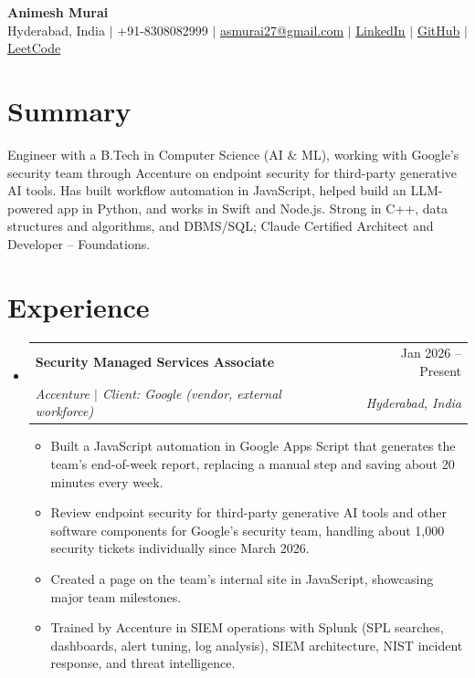 \documentclass[a4paper,11pt]{article}
\makeatletter
\newcommand{\resumeItem}[1]{\item\small{#1\vspace{-1pt}}}
\newcommand{\resumeSubheading}[4]{
  \vspace{-1pt}\item
    \begin{tabularx}{0.97\textwidth}[t]{@{}>{\raggedright\arraybackslash}X@{\hspace{0.75em}}r@{}}
      \textbf{#1} & #2 \\
      \textit{\small#3} & \textit{\small #4} \\
    \end{tabularx}\vspace{-3pt}
}
\newcommand{\resumeSubItemListStart}{\begin{itemize}[leftmargin=0.15in, label={}]}
\newcommand{\resumeSubItemListEnd}{\end{itemize}}
\newcommand{\resumeItemListStart}{\begin{itemize}[itemsep=2pt]}
\newcommand{\resumeItemListEnd}{\end{itemize}\vspace{-2pt}}
\makeatother
\begin{document}
\begin{center}
    {\Huge\bfseries Animesh Murai} \\ \vspace{4pt}
    \small Hyderabad, India $|$ +91-8308082999 $|$
    \href{mailto:asmurai27@gmail.com}{\underline{asmurai27@gmail.com}} $|$
    \href{https://www.linkedin.com/in/animesh-murai-538384253/}{\underline{LinkedIn}} $|$
    \href{https://github.com/muraias7781}{\underline{GitHub}} $|$
    \href{https://leetcode.com/u/sAMurai7781/}{\underline{LeetCode}}
\end{center}

\section{Summary}
  \small{Engineer with a B.Tech in Computer Science (AI \& ML), working with Google's security team through Accenture on endpoint security for third-party generative AI tools. Has built workflow automation in JavaScript, helped build an LLM-powered app in Python, and works in Swift and Node.js. Strong in C++, data structures and algorithms, and DBMS/SQL; Claude Certified Architect and Developer -- Foundations.}

\section{Experience}
  \resumeSubItemListStart

    \resumeSubheading
      {Security Managed Services Associate}{Jan 2026 -- Present}
      {Accenture $|$ Client: Google (vendor, external workforce)}{Hyderabad, India}
      \resumeItemListStart
        \resumeItem{Built a JavaScript automation in Google Apps Script that generates the team's end-of-week report, replacing a manual step and saving about 20 minutes every week.}
        \resumeItem{Review endpoint security for third-party generative AI tools and other software components for Google's security team, handling about 1,000 security tickets individually since March 2026.}
        \resumeItem{Created a page on the team's internal site in JavaScript, showcasing major team milestones.}
        \resumeItem{Trained by Accenture in SIEM operations with Splunk (SPL searches, dashboards, alert tuning, log analysis), SIEM architecture, NIST incident response, and threat intelligence.}
      \resumeItemListEnd

  \resumeSubItemListEnd
\end{document}
